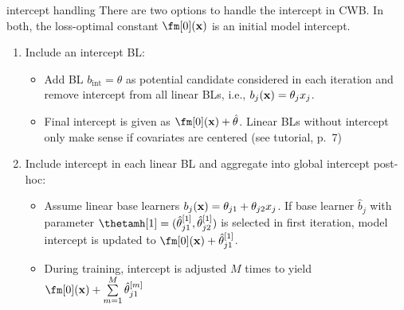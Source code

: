 \documentclass[11pt,compress,t,notes=noshow, xcolor=table]{beamer}
\begin{document}

\begin{framev}{intercept handling}
There are two options to handle the intercept in CWB. In both, the loss-optimal constant $\fm[0](\xv)$ is an initial model intercept. \\
\begin{enumerate}
\setlength{\itemsep}{0.8em}
\item {\small Include an intercept BL}:
  \begin{itemize}
    \setlength{\itemsep}{0.8em}
    \item {\footnotesize Add BL $b_{\text{int}} = \theta$ as potential candidate considered in each iteration and remove intercept from all linear BLs, i.e., $b_j(\mathbf{x}) = \theta_j x_j$.}
    \item {\footnotesize Final intercept is given as $\fm[0](\xv) + \hat{\theta}$. Linear BLs without intercept only make sense if covariates are centered (see  tutorial, p.~7)}
  \end{itemize}
  
  
  \item {\small Include intercept in each linear BL and aggregate into global intercept post-hoc}:
  \begin{itemize} \setlength{\itemsep}{0.8em}
  \item  {\footnotesize Assume linear base learners $b_j(\mathbf{x}) = \theta_{j1} + \theta_{j2} x_j$. %
  If base learner $\hat{b}_j$ with parameter $\thetamh[1] = (\hat{\theta}_{j1}^{[1]}, \hat{\theta}_{j2}^{[1]})$ is selected in first iteration, model intercept is updated to $\fm[0](\xv) + \hat{\theta}_{j1}^{[1]}$.}
    \item {\footnotesize During training, intercept is adjusted $M$ times to yield $\fm[0](\xv) + \sum\limits_{m=1}^M %
    \hat{\theta}^{[m]}_{j1}$}
    \end{itemize}
\end{enumerate}



\end{framev}
\end{document}
